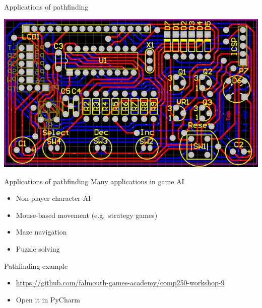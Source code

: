 \begin{frame}{Applications of pathfinding}
    \begin{center}
        \includegraphics[width=\textwidth]{pcb}
    \end{center}
\end{frame}

\begin{frame}{Applications of pathfinding}
    Many applications in game AI \pause
    \begin{itemize}
        \item Non-player character AI \pause
        \item Mouse-based movement (e.g.\ strategy games) \pause
        \item Maze navigation \pause
        \item Puzzle solving
    \end{itemize}
\end{frame}

\begin{frame}{Pathfinding example}
    \begin{itemize}
        \pause\item \url{https://github.com/falmouth-games-academy/comp250-workshop-9}
        \pause\item Open it in PyCharm
    \end{itemize}
\end{frame}

